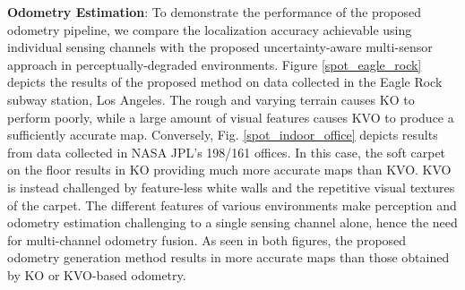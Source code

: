 \documentclass[letterpaper, 10pt, conference]{ieeeconf}      %
\newcommand{\ph}[1]{{\textbf{#1}:}} %
\begin{document}











\ph{Odometry Estimation}
To demonstrate the performance of the proposed odometry pipeline, we compare the localization accuracy achievable using individual sensing channels with the proposed uncertainty-aware multi-sensor approach in perceptually-degraded environments. Figure \ref{spot_eagle_rock} depicts the results of the proposed method on data collected in the Eagle Rock subway station, Los Angeles. The rough and varying terrain causes KO to perform poorly, while a large amount of visual features causes KVO to produce a sufficiently accurate map. Conversely, Fig. \ref{spot_indoor_office} depicts results from data collected in NASA JPL's 198/161 offices. In this case, the soft carpet on the floor results in KO providing much more accurate maps than KVO.  KVO is instead challenged by feature-less white walls and the repetitive visual textures of the carpet. The different features of various environments make perception and odometry estimation challenging to a single sensing channel alone, hence the need for multi-channel odometry fusion. As seen in both figures, the proposed odometry generation method results in more accurate maps than those obtained by KO or KVO-based odometry.




\end{document}
